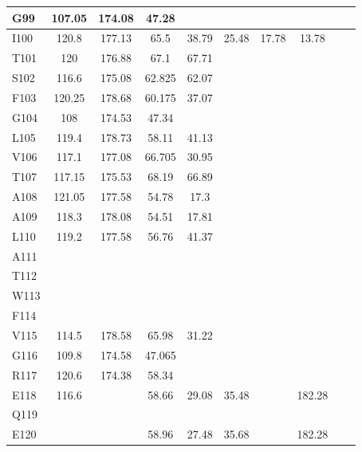 \documentclass[%
 aip,
 amsmath,amssymb,
 preprint,%
]{revtex4-1}
\begin{document}
\begin{center}
\begin{longtable}{l|c|c|c|c|c|c|c|c|c}
G99 & 107.05 & 174.08 & 47.28 & & & & & & \\\hline
I100 & 120.8 & 177.13 & 65.5 & 38.79 & 25.48 & 17.78 & 13.78 & & \\\hline
T101 & 120 & 176.88 & 67.1 & 67.71 & & & & & \\\hline
S102 & 116.6 & 175.08 & 62.825 & 62.07 & & & & & \\\hline
F103 & 120.25 & 178.68 & 60.175 & 37.07 & & & & & \\\hline
G104 & 108 & 174.53 & 47.34 & & & & & & \\\hline
L105 & 119.4 & 178.73 & 58.11 & 41.13 & & & & & \\\hline
V106 & 117.1 & 177.08 & 66.705 & 30.95 & & & & & \\\hline
T107 & 117.15 & 175.53 & 68.19 & 66.89 & & & & & \\\hline
A108 & 121.05 & 177.58 & 54.78 & 17.3 & & & & & \\\hline
A109 & 118.3 & 178.08 & 54.51 & 17.81 & & & & & \\\hline
L110 & 119.2 & 177.58 & 56.76 & 41.37 & & & & & \\\hline
A111 & & & & & & & & & \\\hline
T112 & & & & & & & & & \\\hline
W113 & & & & & & & & & \\\hline
F114 & & & & & & & & & \\\hline
V115 & 114.5 & 178.58 & 65.98 & 31.22 & & & & & \\\hline
G116 & 109.8 & 174.58 & 47.065 & & & & & & \\\hline
R117 & 120.6 & 174.38 & 58.34 & & & & & & \\\hline
E118 & 116.6 & & 58.66 & 29.08 & 35.48 & & 182.28 & & \\\hline
Q119 & & & & & & & & & \\\hline
E120 & & & 58.96 & 27.48 & 35.68 & & 182.28 & & \\\hline
\end{longtable}
\end{center}
\endgroup
\end{document}
